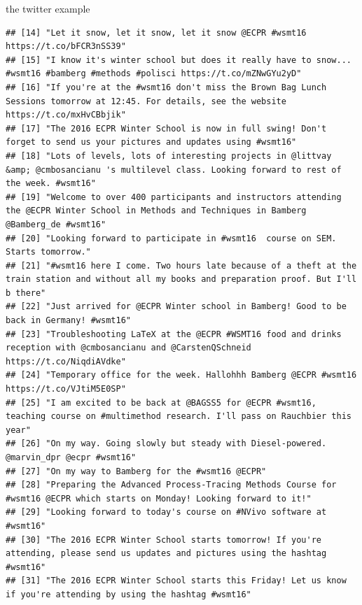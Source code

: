 \documentclass[ignorenonframetext,]{beamer}
\begin{document}
\begin{frame}[fragile]{the twitter example}
\begin{verbatim}
## [14] "Let it snow, let it snow, let it snow @ECPR #wsmt16 https://t.co/bFCR3nSS39"                                                                   
## [15] "I know it's winter school but does it really have to snow... #wsmt16 #bamberg #methods #polisci https://t.co/mZNwGYu2yD"                       
## [16] "If you're at the #wsmt16 don't miss the Brown Bag Lunch Sessions tomorrow at 12:45. For details, see the website https://t.co/mxHvCBbjik"      
## [17] "The 2016 ECPR Winter School is now in full swing! Don't forget to send us your pictures and updates using #wsmt16"                             
## [18] "Lots of levels, lots of interesting projects in @littvay &amp; @cmbosancianu 's multilevel class. Looking forward to rest of the week. #wsmt16"
## [19] "Welcome to over 400 participants and instructors attending the @ECPR Winter School in Methods and Techniques in Bamberg @Bamberg_de #wsmt16"   
## [20] "Looking forward to participate in #wsmt16  course on SEM. Starts tomorrow."                                                                    
## [21] "#wsmt16 here I come. Two hours late because of a theft at the train station and without all my books and preparation proof. But I'll b there"  
## [22] "Just arrived for @ECPR Winter school in Bamberg! Good to be back in Germany! #wsmt16"                                                          
## [23] "Troubleshooting LaTeX at the @ECPR #WSMT16 food and drinks reception with @cmbosancianu and @CarstenQSchneid https://t.co/NiqdiAVdke"          
## [24] "Temporary office for the week. Hallohhh Bamberg @ECPR #wsmt16 https://t.co/VJtiM5E0SP"                                                         
## [25] "I am excited to be back at @BAGSS5 for @ECPR #wsmt16, teaching course on #multimethod research. I'll pass on Rauchbier this year"              
## [26] "On my way. Going slowly but steady with Diesel-powered. @marvin_dpr @ecpr #wsmt16"                                                             
## [27] "On my way to Bamberg for the #wsmt16 @ECPR"                                                                                                    
## [28] "Preparing the Advanced Process-Tracing Methods Course for #wsmt16 @ECPR which starts on Monday! Looking forward to it!"                        
## [29] "Looking forward to today's course on #NVivo software at #wsmt16"                                                                               
## [30] "The 2016 ECPR Winter School starts tomorrow! If you're attending, please send us updates and pictures using the hashtag #wsmt16"               
## [31] "The 2016 ECPR Winter School starts this Friday! Let us know if you're attending by using the hashtag #wsmt16"
\end{verbatim}

\end{frame}
\end{document}
